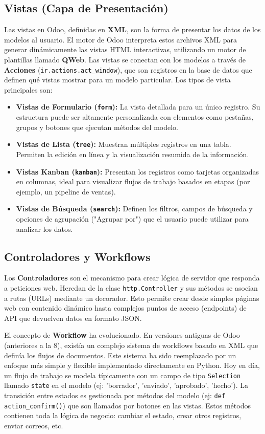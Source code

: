 \documentclass[12pt,letterpaper,spanish]{report}
\begin{document}
\subsection{Vistas (Capa de Presentación)}
\label{sub:vistas_odoo}
Las vistas en Odoo, definidas en \textbf{XML}, son la forma de presentar los datos de los modelos al usuario. El motor de Odoo interpreta estos archivos XML para generar dinámicamente las vistas HTML interactivas, utilizando un motor de plantillas llamado \textbf{QWeb}. Las vistas se conectan con los modelos a través de \textbf{Acciones} (\texttt{ir.actions.act\_window}), que son registros en la base de datos que definen qué vistas mostrar para un modelo particular. Los tipos de vista principales son:
\begin{itemize}
    \item \textbf{Vistas de Formulario (\texttt{form}):} La vista detallada para un único registro. Su estructura puede ser altamente personalizada con elementos como pestañas, grupos y botones que ejecutan métodos del modelo.
    \item \textbf{Vistas de Lista (\texttt{tree}):} Muestran múltiples registros en una tabla. Permiten la edición en línea y la visualización resumida de la información.
    \item \textbf{Vistas Kanban (\texttt{kanban}):} Presentan los registros como tarjetas organizadas en columnas, ideal para visualizar flujos de trabajo basados en etapas (por ejemplo, un pipeline de ventas).
    \item \textbf{Vistas de Búsqueda (\texttt{search}):} Definen los filtros, campos de búsqueda y opciones de agrupación ("Agrupar por") que el usuario puede utilizar para analizar los datos.
\end{itemize}

\subsection{Controladores y Workflows}
\label{sub:controladores_workflows}
Los \textbf{Controladores} son el mecanismo para crear lógica de servidor que responda a peticiones web. Heredan de la clase \texttt{http.Controller} y sus métodos se asocian a rutas (URLs) mediante un decorador. Esto permite crear desde simples páginas web con contenido dinámico hasta complejos puntos de acceso (endpoints) de API que devuelven datos en formato JSON.

El concepto de \textbf{Workflow} ha evolucionado. En versiones antiguas de Odoo (anteriores a la 8), existía un complejo sistema de workflows basado en XML que definía los flujos de documentos. Este sistema ha sido reemplazado por un enfoque más simple y flexible implementado directamente en Python. Hoy en día, un flujo de trabajo se modela típicamente con un campo de tipo \texttt{Selection} llamado \texttt{state} en el modelo (ej: 'borrador', 'enviado', 'aprobado', 'hecho'). La transición entre estados es gestionada por métodos del modelo (ej: \texttt{def action\_confirm()}) que son llamados por botones en las vistas. Estos métodos contienen toda la lógica de negocio: cambiar el estado, crear otros registros, enviar correos, etc.
\end{document}
